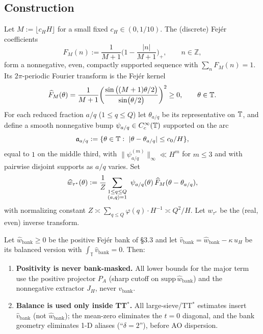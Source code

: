 \subsection{Construction}
Let $M:=\lfloor c_H H\rfloor$ for a small fixed $c_H\in(0,1/10)$. The (discrete) Fej\'er coefficients
\[
F_M(n):=\frac{1}{M+1}\Big(1-\frac{|n|}{M+1}\Big)_+,\qquad n\in\mathbb{Z},
\]
form a nonnegative, even, compactly supported sequence with $\sum_{n}F_M(n)=1$. Its $2\pi$-periodic Fourier transform is the Fej\'er kernel
\[
\widehat F_M(\theta)=\frac{1}{M+1}\bigg(\frac{\sin\big((M+1)\theta/2\big)}{\sin(\theta/2)}\bigg)^2\ge 0,\qquad \theta\in\mathbb{T}.
\]
For each reduced fraction $a/q$ ($1\le q\le Q$) let $\theta_{a/q}$ be its representative on $\mathbb{T}$, and define a smooth nonnegative bump $\psi_{a/q}\in C_c^\infty(\mathbb{T})$ supported on the arc
\[
\mathfrak a_{a/q}:=\{\theta\in\mathbb{T}:\ |\theta-\theta_{a/q}|\le c_0/H\},
\]
equal to $1$ on the middle third, with $\|\psi_{a/q}^{(m)}\|_\infty\ll H^m$ for $m\le 3$ and with pairwise disjoint supports as $a/q$ varies. Set
\[
\widehat w_{\tau^\ast}(\theta):=\frac{1}{Z}\sum_{\substack{1\le q\le Q\\ (a,q)=1}}\ \psi_{a/q}(\theta)\,\widehat F_M(\theta-\theta_{a/q}),
\]
with normalizing constant $Z\asymp \sum_{q\le Q}\varphi(q)\cdot H^{-1}\asymp Q^2/H$. Let $w_{\tau^\ast}$ be the (real, even) inverse transform.

\begin{lemma}\label{lem:sep-roles}
Let $\widehat w_{\mathrm{bank}}\ge0$ be the positive Fejér bank of \S3.3 and let 
$\widehat v_{\mathrm{bank}}=\widehat w_{\mathrm{bank}}-\kappa\,u_H$ be its balanced version with
$\int_{\mathbb T}\widehat v_{\mathrm{bank}}=0$.
Then:
\begin{enumerate}
\item[(i)] \textbf{Positivity is never bank-masked.} All lower bounds for the major term use the positive projector $P_A$ (sharp cutoff on $\mathrm{supp}\,\widehat w_{\mathrm{bank}}$) and the nonnegative extractor $J_H$, never $v_{\mathrm{bank}}$.
\item[(ii)] \textbf{Balance is used only inside TT$^\ast$.} All large-sieve/TT$^\ast$ estimates insert $\widehat v_{\mathrm{bank}}$ (not $\widehat w_{\mathrm{bank}}$); the mean-zero eliminates the $t=0$ diagonal, and the bank geometry eliminates 1-D aliases (``$\delta=2$''), before AO dispersion.
\end{enumerate}
\end{lemma}


